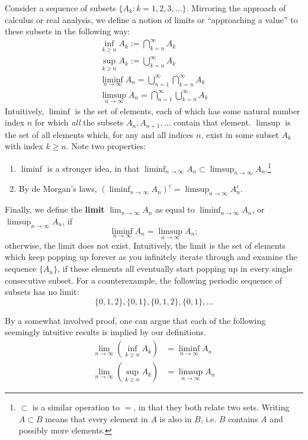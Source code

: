 \documentclass[12pt]{article}
\begin{document}
Consider a sequence of subsets $\{ A_k : k = 1, 2, 3, \ldots \}$. Mirroring the approach of calculus or real analysis, we define a notion of limits or ``approaching a value'' to these subsets in the following way:
\begin{gather*}
\inf_{k \geq n} A_k := \bigcap_{k = n}^\infty A_k \\
\sup_{k \geq n} A_k := \bigcup_{k = n}^\infty A_k \\
\liminf_{n \to \infty} A_n = \bigcup_{n = 1}^\infty \bigcap_{k = n}^\infty A_k \\
\limsup_{n \to \infty} A_n = \bigcap_{n = 1}^\infty \bigcup_{k = n}^\infty A_k
\end{gather*}
Intuitively, $\liminf$ is the set of elements, each of which has some natural number index $n$ for which \emph{all} the subsets $A_n, A_{n + 1}, \ldots$ contain that element. $\limsup$ is the set of all elements which, for any and all indices $n$, exist in some subset $A_k$ with index $k \geq n$. Note two properties:
\begin{enumerate}
\item $\liminf$ is a stronger idea, in that $\liminf_{n \to \infty} A_n \subset \limsup_{n \to \infty} A_n$.\footnote{$\subset$ is a similar operation to $=$, in that they both relate two sets. Writing $A \subset B$ means that every element in $A$ is also in $B$, i.e. $B$ contains $A$ and possibly more elements.}
\item By de Morgan's laws, $(\liminf_{n \to \infty} A_n)^c = \limsup_{n \to \infty} A_n^c$.
\end{enumerate}

Finally, we define the \textbf{limit} $\lim_{n \to \infty} A_n$ as equal to $\liminf_{n \to \infty} A_n$, or $\limsup_{n \to \infty} A_n$, if
\[ \liminf_{n \to \infty} A_n = \limsup_{n \to \infty} A_n; \]
otherwise, the limit does not exist. Intuitively, the limit is the set of elements which keep popping up forever as you infinitely iterate through and examine the sequence $\{ A_n \}$, if these elements all eventually start popping up in every single consecutive subset. For a counterexample, the following periodic sequence of subsets has no limit:
\[ \{ 0, 1, 2 \}, \{ 0, 1 \}, \{ 0, 1, 2 \}, \{ 0, 1 \}, \ldots \]

By a somewhat involved proof, one can argue that each of the following seemingly intuitive results is implied by our definitions.
\begin{align*}
\lim_{n \to \infty} \left( \inf_{k \geq n} A_k \right) &= \liminf_{n \to \infty} A_n \\
\lim_{n \to \infty} \left( \sup_{k \geq n} A_k \right) &= \limsup_{n \to \infty} A_n
\end{align*}
\end{document}
